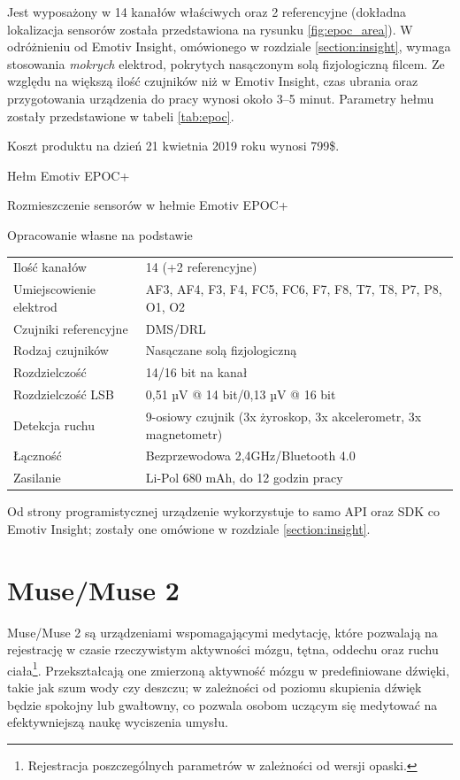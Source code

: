 \documentclass[skorowidz,skroty]{dyplomWEZUT}
\begin{document}
Jest wyposażony w 14 kanałów właściwych oraz 2 referencyjne (dokładna lokalizacja sensorów została przedstawiona na rysunku \vref{fig:epoc_area}). W odróżnieniu od Emotiv Insight, omówionego w rozdziale \vref{section:insight}, wymaga stosowania \textit{mokrych} elektrod, pokrytych nasączonym solą fizjologiczną filcem. Ze względu na większą ilość czujników niż w Emotiv Insight, czas ubrania oraz przygotowania urządzenia do pracy wynosi około 3--5 minut. Parametry hełmu zostały przedstawione w tabeli \vref{tab:epoc}.

Koszt produktu na dzień 21 kwietnia 2019 roku wynosi 799\$.

{Hełm Emotiv EPOC+\label{fig:epoc}}
{\cite{emotiv_epoc}}

{Rozmieszczenie sensorów w hełmie Emotiv EPOC+\label{fig:epoc_area}}
{\cite{emotiv_epoc}}

{Opracowanie własne na podstawie \cite{emotiv_comparison}}
{
    \begin{tabular}{l|l}
        Ilość kanałów & 14 (+2 referencyjne)\\
        Umiejscowienie elektrod & AF3, AF4, F3, F4, FC5, FC6, F7, F8, T7, T8, P7, P8, O1, O2\\
        Czujniki referencyjne & DMS/DRL\\
        Rodzaj czujników & Nasączane solą fizjologiczną\\
        Rozdzielczość & 14/16 bit na kanał\\
        Rozdzielczość LSB & 0,51 µV @ 14 bit/0,13 µV @ 16 bit\\
        Detekcja ruchu & 9-osiowy czujnik (3x żyroskop, 3x akcelerometr, 3x magnetometr)\\
        Łączność & Bezprzewodowa 2,4GHz/Bluetooth 4.0\\
        Zasilanie & Li-Pol 680 mAh, do 12 godzin pracy
    \end{tabular}
}

Od strony programistycznej urządzenie wykorzystuje to samo API oraz SDK co Emotiv Insight; zostały one omówione w rozdziale \vref{section:insight}.


\section{Muse/Muse 2}
Muse/Muse 2 są urządzeniami wspomagającymi medytację, które pozwalają na rejestrację w czasie rzeczywistym aktywności mózgu, tętna, oddechu oraz ruchu ciała\footnote{Rejestracja poszczególnych parametrów w zależności od wersji opaski.}\cite{muse2}. Przekształcają one zmierzoną aktywność mózgu w predefiniowane dźwięki, takie jak szum wody czy deszczu; w zależności od poziomu skupienia dźwięk będzie spokojny lub gwałtowny, co pozwala osobom uczącym się medytować na efektywniejszą naukę wyciszenia umysłu.
\end{document}
